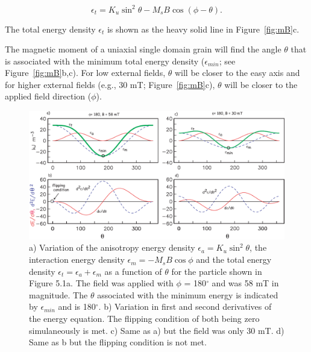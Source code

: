  
\begin{equation}
\epsilon_t = K_u\sin^2\theta - M_s B \cos (\phi-\theta).
\label{eq:Et}
\end{equation}

\noindent  The total energy density $\epsilon_t$ is shown as the heavy solid line in Figure~\ref{fig:mB}c. 



The magnetic moment of a uniaxial single domain grain will find the angle $\theta$ that is associated with the minimum total energy density ($\epsilon_{min}$; see Figure~\ref{fig:mB}b,c).  For low external fields, $\theta$ will be closer to the easy axis  and for higher external fields (e.g., 30 mT; Figure~\ref{fig:mB}c), $\theta$ will be closer to the applied field direction ($\phi$).  



\begin{figure}[h!tb]
\centering  \includegraphics[width=14 cm]{EPSfiles/flip.eps}
\caption{a) Variation of the anisotropy energy density  $\epsilon_a = K_u\sin^2\theta$, the interaction energy density $\epsilon_m=-M_s B\cos \phi$ and the total energy density $\epsilon_t=\epsilon_a+\epsilon_m$ as a function of $\theta$ for the particle shown in Figure 5.1a.  The  field was applied with $\phi$ = 180$^{\circ}$ and was 58 mT in magnitude.  The $\theta$ associated with the minimum energy is indicated by $\epsilon_{min}$ and is 180$^{\circ}$.  b) Variation in first and second derivatives of the energy equation.  The flipping condition of both being zero simulaneously is met.  c) Same as a) but the field was only 30 mT.  d) Same as b but the flipping condition is not met.} 
\label{fig:flip}
\end{figure}


